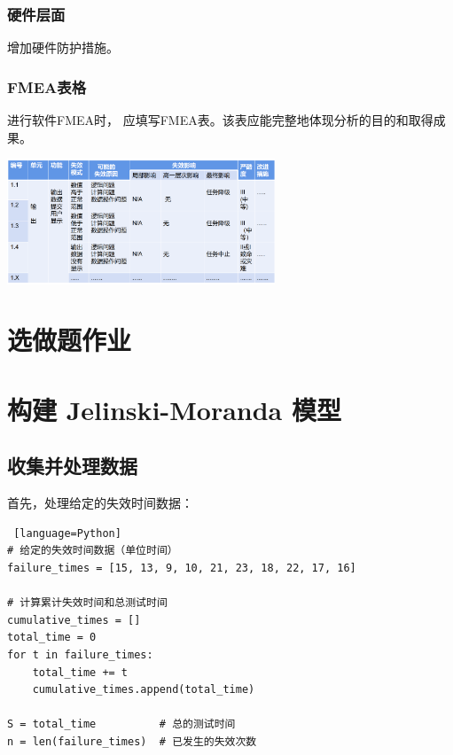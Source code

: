 \subsubsection{硬件层面}

增加硬件防护措施。

\subsubsection{FMEA表格}

进行软件FMEA时， 应填写FMEA表。该表应能完整地体现分析的目的和取得成果。

\noindent
\begin{minipage}{\textwidth}
    \centering
    \includegraphics[width=0.6\textwidth]{img3/table.png}
    \label{fig:FMEA}
\end{minipage}

\section{选做题作业}
\section*{构建 Jelinski-Moranda 模型}

\subsection*{收集并处理数据}

首先，处理给定的失效时间数据：

\begin{lstlisting} [language=Python]
# 给定的失效时间数据（单位时间）
failure_times = [15, 13, 9, 10, 21, 23, 18, 22, 17, 16]

# 计算累计失效时间和总测试时间
cumulative_times = []
total_time = 0
for t in failure_times:
    total_time += t
    cumulative_times.append(total_time)

S = total_time          # 总的测试时间
n = len(failure_times)  # 已发生的失效次数
\end{lstlisting}

